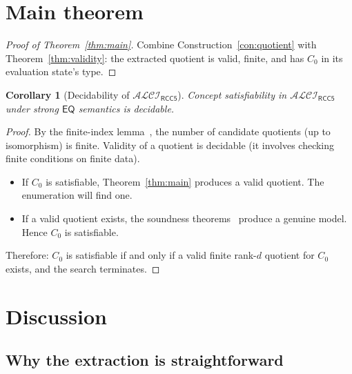\documentclass[11pt]{article}
\newtheorem{corollary}[theorem]{Corollary}
\theoremstyle{definition}
\theoremstyle{remark}
\newcommand{\EQ}{\mathsf{EQ}}
\newcommand{\ALCIRCC}[1]{\mathcal{ALCI}_{\mathsf{RCC#1}}}
\begin{document}
\section{Main theorem}
\label{sec:main}

\begin{proof}[Proof of Theorem~\ref{thm:main}]
Combine Construction~\ref{con:quotient} with
Theorem~\ref{thm:validity}: the extracted quotient is valid, finite,
and has $C_0$ in its evaluation state's type.
\end{proof}

\begin{corollary}[Decidability of $\ALCIRCC{5}$]\label{cor:decidability}
Concept satisfiability in $\ALCIRCC{5}$ under strong $\EQ$ semantics
is decidable.
\end{corollary}

\begin{proof}
By the finite-index lemma~\cite[Theorem~1.25]{SplitForest}, the
number of candidate quotients (up to isomorphism) is finite.
Validity of a quotient is decidable (it involves checking finite
conditions on finite data).

\begin{itemize}
\item If $C_0$ is satisfiable, Theorem~\ref{thm:main} produces a
  valid quotient.  The enumeration will find one.
\item If a valid quotient exists, the soundness
  theorems~\cite[Theorems~1.18, 1.19]{SplitForest} produce a genuine
  model.  Hence $C_0$ is satisfiable.
\end{itemize}

Therefore: $C_0$ is satisfiable if and only if a valid finite rank-$d$
quotient for $C_0$ exists, and the search terminates.
\end{proof}


\section{Discussion}
\label{sec:discussion}

\subsection{Why the extraction is straightforward}
\end{document}
